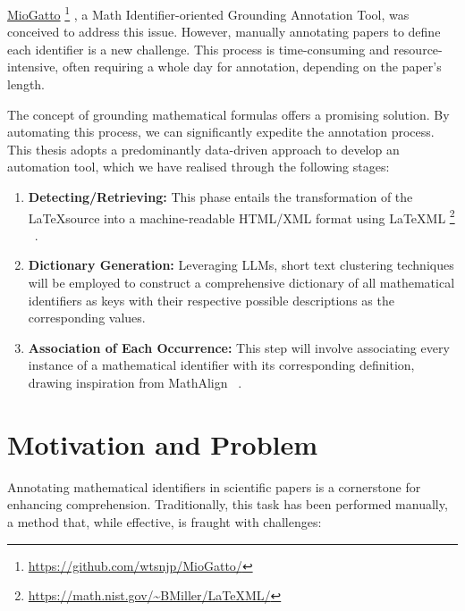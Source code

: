 \href{https://github.com/wtsnjp/MioGatto/tree/main}{MioGatto} \footnote{\url{https://github.com/wtsnjp/MioGatto/}} \citep{asakura2021miogatto}, a Math Identifier-oriented Grounding Annotation Tool, was conceived to address this issue. However, manually annotating papers to define each identifier is a new challenge. This process is time-consuming and resource-intensive, often requiring a whole day for annotation, depending on the paper's length.

The concept of grounding mathematical formulas \citep{asakura2020towards} offers a promising solution. By automating this process, we can significantly expedite the annotation process. This thesis adopts a predominantly data-driven approach to develop an automation tool, which we have realised through the following stages:

\begin{enumerate}
    \item \textbf{Detecting/Retrieving:} This phase entails the transformation of the \LaTeX \space source into a machine-readable HTML/XML format using \LaTeX ML \footnote{\url{https://math.nist.gov/~BMiller/LaTeXML/}} ~\citep{ginev2011latexml}.
    
    \item \textbf{Dictionary Generation:} Leveraging \ac{LLMs}, short text clustering techniques will be employed to construct a comprehensive dictionary of all mathematical identifiers as keys with their respective possible descriptions as the corresponding values.
    
    
    \item \textbf{Association of Each Occurrence:} This step will involve associating every instance of a mathematical identifier with its corresponding definition, drawing inspiration from MathAlign ~\citep{alexeeva2020mathalign}.
\end{enumerate}


\section{Motivation and Problem}

Annotating mathematical identifiers in scientific papers is a cornerstone for enhancing comprehension. Traditionally, this task has been performed manually, a method that, while effective, is fraught with challenges:

